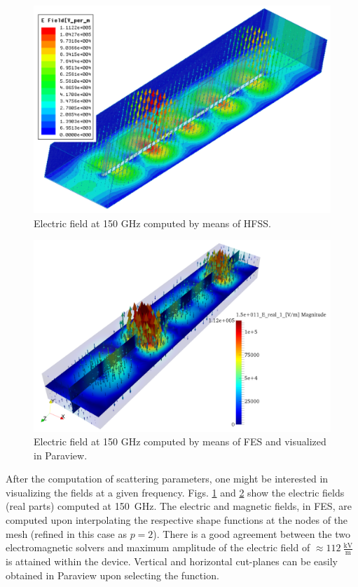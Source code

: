 \begin{figure}[h!]
\centering
\includegraphics[width=13.4cm]{Bilat3DHFSS}
\caption{Electric field at 150 GHz computed by means of HFSS.}
\label{fig:Bilat3DHFSS}
\end{figure}

\begin{figure}[h!]
\centering
\includegraphics[width=13.4cm]{Bilat3D}
\caption{Electric field at 150 GHz computed by means of FES and visualized in Paraview.}
\label{fig:Bilat3D}
\end{figure}

After the computation of scattering parameters, one might be interested in visualizing the fields at a given frequency. Figs. \ref{fig:Bilat3DHFSS} and \ref{fig:Bilat3D} show the electric fields (real parts) computed at 150~GHz. The electric and magnetic fields, in FES, are computed upon interpolating the respective shape functions at the nodes of the mesh (refined in this case as $p=2$). There is a good agreement between the two electromagnetic solvers and maximum amplitude of the electric field of $\approx 112~\frac{\mathrm{kV}}{\mathrm{m}}$ is attained within the device. Vertical and horizontal cut-planes can be easily obtained in Paraview upon selecting the  function. 

